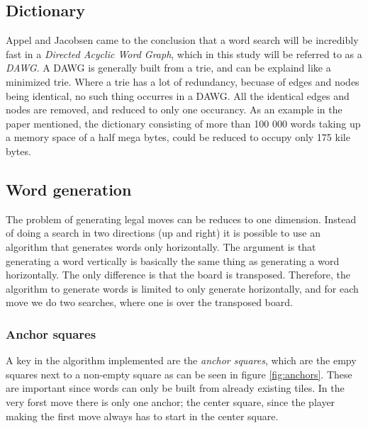 \documentclass[a4paper, 12pt]{report}
\begin{document}
\subsection{Dictionary}
Appel and Jacobsen \cite{fastest} came to the conclusion that a word search will be incredibly fast in a \emph{Directed Acyclic Word Graph}, which in this study will be referred to as a \emph{DAWG}. A DAWG is generally built from a trie, and can be explaind like a minimized trie. Where a trie has a lot of redundancy, becuase of edges and nodes being identical, no such thing occurres in a DAWG. All the identical edges and nodes are removed, and reduced to only one occurancy. As an example in the paper mentioned, the dictionary consisting of more than 100 000 words taking up a memory space of a half mega bytes, could be reduced to occupy only 175 kile bytes.


\subsection{Word generation}
The problem of generating legal moves can be reduces to one dimension. Instead of doing a search in two directions (up and right) it is possible to use an algorithm that generates words only horizontally. The argument is that generating a word vertically is basically the same thing as generating a word horizontally. The only difference is that the board is transposed. Therefore, the algorithm to generate words is limited to only generate horizontally, and for each move we do two searches, where one is over the transposed board.

\subsubsection{Anchor squares}
A key in the algorithm implemented are the \emph{anchor squares}, which are the empy squares next to a non-empty square as can be seen in figure \ref{fig:anchors}. These are important since words can only be built from already existing tiles. In the very forst move there is only one anchor; the center square, since the player making the first move always has to start in the center square.
\end{document}
